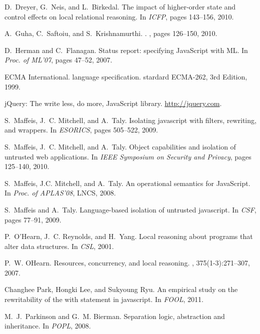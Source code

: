 \documentclass{article}
\newcommand{\ifshort}[1]{}
\begin{document}
{\begin{thebibliography}{10}
D.~Dreyer, G.~Neis, and L.~Birkedal.
\newblock The impact of higher-order state and control effects on local
  relational reasoning.
\newblock In {\em ICFP}, pages 143--156, 2010.

\ifshort{\bibitem{proofs}
P.~Gardner, S.~Maffeis, and G.~Smith.
\newblock Towards a program logic for {J}ava{S}cript.
\newblock Imperial College London Technical Report number DTR11-11, November
  2011.}

A.~Guha, C.~Saftoiu, and S.~Krishnamurthi.
.
, pages 126--150, 2010.

D.~Herman and C.~Flanagan.
\newblock Status report: specifying {JavaScript} with {ML}.
\newblock In {\em Proc. of ML'07}, pages 47--52, 2007.

ECMA International.
 language specification. stardard {ECMA}-262, 3rd
  {E}dition, 1999.

{jQuery}: The write less, do more, {JavaScript} library.
\newblock \url{http://jquery.com}.

S.~Maffeis, J.~C. Mitchell, and A.~Taly.
\newblock Isolating javascript with filters, rewriting, and wrappers.
\newblock In {\em ESORICS}, pages 505--522, 2009.

S.~Maffeis, J.~C. Mitchell, and A.~Taly.
\newblock Object capabilities and isolation of untrusted web applications.
\newblock In {\em IEEE Symposium on Security and Privacy}, pages 125--140,
  2010.

S.~Maffeis, J.C. Mitchell, and A.~Taly.
\newblock An operational semantics for {JavaScript}.
\newblock In {\em Proc. of {APLAS}'08}, LNCS, 2008.

S.~Maffeis and A.~Taly.
\newblock Language-based isolation of untrusted javascript.
\newblock In {\em CSF}, pages 77--91, 2009.

P.~O'Hearn, J.~C. Reynolds, and H.~Yang.
\newblock Local reasoning about programs that alter data structures.
\newblock In {\em CSL}, 2001.

P.~W. OHearn.
\newblock Resources, concurrency, and local reasoning.
, 375(1-3):271--307, 2007.

Changhee Park, Hongki Lee, and Sukyoung Ryu.
\newblock An empirical study on the rewritability of the with statement in
  javascript.
\newblock In {\em FOOL}, 2011.
\ifshort{\vfill\eject}
M.~J.~Parkinson and G.~M. Bierman.
\newblock Separation logic, abstraction and inheritance.
\newblock In {\em POPL}, 2008.


\end{thebibliography}}
\end{document}
